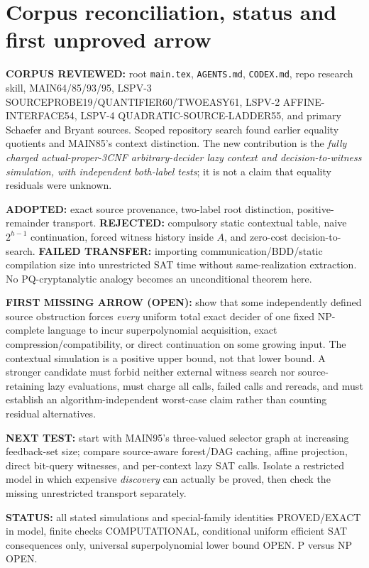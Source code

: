 \documentclass[11pt]{article}
\begin{document}
\section{Corpus reconciliation, status and first unproved arrow}
\noindent \textbf{CORPUS REVIEWED:} root \texttt{main.tex}, \texttt{AGENTS.md}, \texttt{CODEX.md}, repo research skill, MAIN64/85/93/95, LSPV-3 SOURCEPROBE19/QUANTIFIER60/TWOEASY61, LSPV-2 AFFINE-INTERFACE54, LSPV-4 QUADRATIC-SOURCE-LADDER55, and primary Schaefer and Bryant sources. Scoped repository search found earlier equality quotients and MAIN85's context distinction. The new contribution is the \emph{fully charged actual-proper-3CNF arbitrary-decider lazy context and decision-to-witness simulation, with independent both-label tests}; it is not a claim that equality residuals were unknown.
\par\noindent \textbf{ADOPTED:} exact source provenance, two-label root distinction, positive-remainder transport. \textbf{REJECTED:} compulsory static contextual table, naive $2^{h-1}$ continuation, forced witness history inside $A$, and zero-cost decision-to-search. \textbf{FAILED TRANSFER:} importing communication/BDD/static compilation size into unrestricted SAT time without same-realization extraction. No PQ-cryptanalytic analogy becomes an unconditional theorem here.
\par\noindent \textbf{FIRST MISSING ARROW (OPEN):} show that some independently defined source obstruction forces \emph{every} uniform total exact decider of one fixed NP-complete language to incur superpolynomial acquisition, exact compression/compatibility, or direct continuation on some growing input. The contextual simulation is a positive upper bound, not that lower bound. A stronger candidate must forbid neither external witness search nor source-retaining lazy evaluations, must charge all calls, failed calls and rereads, and must establish an algorithm-independent worst-case claim rather than counting residual alternatives.
\par\noindent \textbf{NEXT TEST:} start with MAIN95's three-valued selector graph at increasing feedback-set size; compare source-aware forest/DAG caching, affine projection, direct bit-query witnesses, and per-context lazy SAT calls. Isolate a restricted model in which expensive \emph{discovery} can actually be proved, then check the missing unrestricted transport separately.
\par\noindent \textbf{STATUS:} all stated simulations and special-family identities PROVED/EXACT in model, finite checks COMPUTATIONAL, conditional uniform efficient SAT consequences only, universal superpolynomial lower bound OPEN. P versus NP OPEN.
\end{document}
